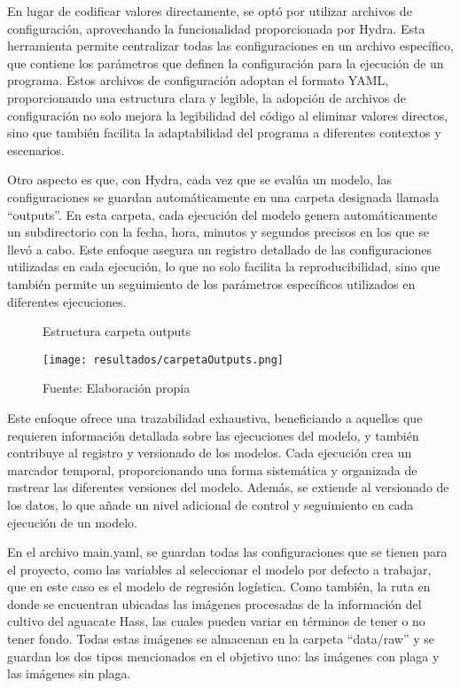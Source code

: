 \newpage

En lugar de codificar valores directamente, se optó por utilizar archivos de configuración, aprovechando la funcionalidad proporcionada por Hydra. Esta herramienta permite centralizar todas las configuraciones en un archivo específico, que contiene los parámetros que definen la configuración para la ejecución de un programa. Estos archivos de configuración adoptan el formato YAML, proporcionando una estructura clara y legible, la adopción de archivos de configuración no solo mejora la legibilidad del código al eliminar valores directos, sino que también facilita la adaptabilidad del programa a diferentes contextos y escenarios. \newline

Otro aspecto es que, con Hydra, cada vez que se evalúa un modelo, las configuraciones se guardan automáticamente en una carpeta designada llamada ``outputs''. En esta carpeta, cada ejecución del modelo genera automáticamente un subdirectorio con la fecha, hora, minutos y segundos precisos en los que se llevó a cabo. Este enfoque asegura un registro detallado de las configuraciones utilizadas en cada ejecución, lo que no solo facilita la reproducibilidad, sino que también permite un seguimiento de los parámetros específicos utilizados en diferentes ejecuciones.

\begin{figure}[h]
\centering
\caption{Estructura carpeta outputs}
\texttt{[image: resultados/carpetaOutputs.png]}
\caption*{\footnotesize Fuente: Elaboración propia}
\label{fig:figuraEstructuraCarpetaOutputs}
\end{figure}

Este enfoque ofrece una trazabilidad exhaustiva, beneficiando a aquellos que requieren información detallada sobre las ejecuciones del modelo, y también contribuye al registro y versionado de los modelos. Cada ejecución crea un marcador temporal, proporcionando una forma sistemática y organizada de rastrear las diferentes versiones del modelo. Además, se extiende al versionado de los datos, lo que añade un nivel adicional de control y seguimiento en cada ejecución de un modelo. \newline

En el archivo main.yaml, se guardan todas las configuraciones que se tienen para el proyecto, como las variables al seleccionar el modelo por defecto a trabajar, que en este caso es el modelo de regresión logística. Como también, la ruta en donde se encuentran ubicadas las imágenes procesadas de la información del cultivo del aguacate Hass, las cuales pueden variar en términos de tener o no tener fondo. Todas estas imágenes se almacenan en la carpeta “data/raw” y se guardan los dos tipos mencionados en el objetivo uno: las imágenes con plaga y las imágenes sin plaga.


